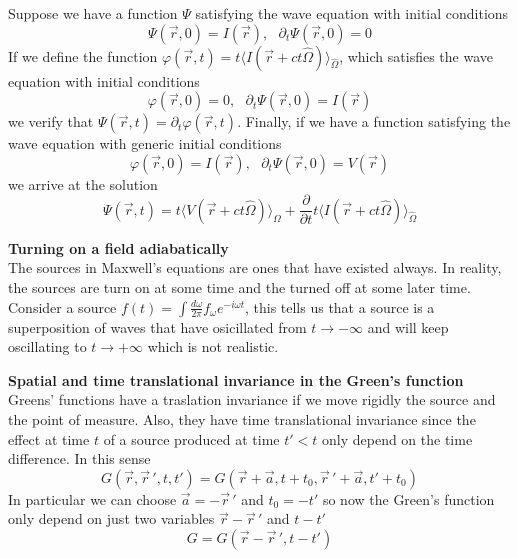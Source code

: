 \documentclass[12pt,a4paper]{article}
\newcommand{\pd}[2]{\frac{\partial #1}{\partial #2}} %
\begin{document}
Suppose we have a function $\Psi$ satisfying the wave equation with initial conditions
\begin{equation}
	\Psi(\vec{r},0) = I(\vec{r}), \ \ \ \partial_t \Psi(\vec{r},0) = 0
\end{equation}
If we define the function $\varphi(\vec{r},t) =t \langle I(\vec{r} + ct\hat{\Omega}) \rangle_{\hat{\Omega}}$, which satisfies the wave equation with initial conditions
\begin{equation}
	\varphi(\vec{r},0) = 0, \ \ \ \partial_t \Psi(\vec{r},0) = I(\vec{r})
\end{equation}
we verify that $\Psi(\vec{r},t) = \partial_t \varphi(\vec{r},t)$. Finally, if we have a function satisfying the wave equation with generic initial conditions
\begin{equation}
	\varphi(\vec{r},0) = I(\vec{r}), \ \ \ \partial_t \Psi(\vec{r},0) = V(\vec{r})
\end{equation}
we arrive at the solution
\begin{equation}
	\Psi(\vec{r},t) = t \langle V(\vec{r} + ct\hat{\Omega})\rangle_{\hat{\Omega}} + \pd{}{t} t \langle I(\vec{r} + ct\hat{\Omega})\rangle_{\hat{\Omega}}
\end{equation}

\textbf{Turning on a field adiabatically}\\
The sources in Maxwell's equations are ones that have existed always. In reality, the sources are turn on at some time and the turned off at some later time.
Consider a source $f(t) = \int \frac{d\omega}{2\pi}f_{\omega}e^{-i\omega t}$, this tells us that a source is a superposition of waves that have osicillated from $t\to-\infty$ and will keep oscillating to $t\to+\infty$ which is not realistic.



\textbf{Spatial and time translational invariance in the Green's function}\\
Greens' functions have a traslation invariance if we move rigidly the source and the point of measure. Also, they have time translational invariance since  the effect at time $t$ of a source produced at time $t'<t$ only depend on the time difference. In this sense
\begin{equation}
	G(\vec{r},\vec{r}\,',t,t')= G(\vec{r}+ \vec{a},t+t_0,\vec{r}\,'+\vec{a},t'+t_0)
\end{equation}
In particular we can choose $\vec{a} = -\vec{r}\,'$ and $t_0 = -t'$ so now the Green's function only depend on just two variables $\vec{r}-\vec{r}\,'$ and $t-t'$
\begin{equation}
	G = G(\vec{r}-\vec{r}\,',t-t')
\end{equation}
\end{document}
